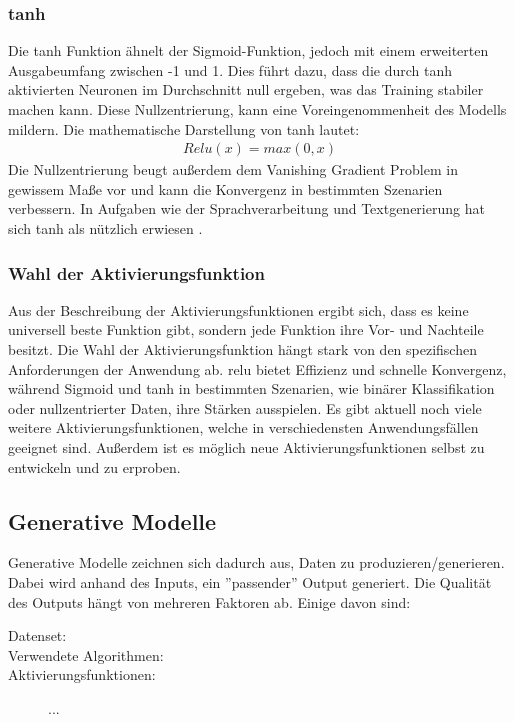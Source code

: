 \documentclass[12pt,a4paper]{article}
\begin{document}
		\subsubsection*{\ac{tanh}}
			Die \ac{tanh} Funktion ähnelt der Sigmoid-Funktion, jedoch mit einem erweiterten Ausgabeumfang zwischen -1 und 1. 
			Dies führt dazu, dass die durch \ac{tanh} aktivierten Neuronen im Durchschnitt null ergeben, was das Training stabiler machen kann. 
			Diese Nullzentrierung, kann eine Voreingenommenheit des Modells mildern. 
			Die mathematische Darstellung von \ac{tanh} lautet:
			\begin{align}
				Relu(x) = max(0,x)
			\end{align}
			Die Nullzentrierung beugt außerdem dem Vanishing Gradient Problem in gewissem Maße vor und kann die Konvergenz in bestimmten Szenarien verbessern.
			In Aufgaben wie der Sprachverarbeitung und Textgenerierung hat sich \ac{tanh} als nützlich erwiesen \cite[\ac{vgl}][]{site:machinelearningautomation}.

		\subsubsection*{Wahl der Aktivierungsfunktion}
			Aus der Beschreibung der Aktivierungsfunktionen ergibt sich, dass es keine universell beste Funktion gibt, sondern jede Funktion ihre Vor- und Nachteile besitzt.
			Die Wahl der Aktivierungsfunktion hängt stark von den spezifischen Anforderungen der Anwendung ab.
			\ac{relu} bietet Effizienz und schnelle Konvergenz, während Sigmoid und \ac{tanh} in bestimmten Szenarien, wie binärer Klassifikation oder nullzentrierter Daten, ihre Stärken ausspielen.
			Es gibt aktuell noch viele weitere Aktivierungsfunktionen, welche in verschiedensten Anwendungsfällen geeignet sind. 
			Außerdem ist es möglich neue Aktivierungsfunktionen selbst zu entwickeln und zu erproben.

	\subsection{Generative Modelle}
		Generative Modelle zeichnen sich dadurch aus, Daten zu produzieren/generieren.
		Dabei wird anhand des Inputs, ein ''passender'' Output generiert.
		Die Qualität des Outputs hängt von mehreren Faktoren ab.
		Einige davon sind: %
		\begin{description}
			\item[Datenset:]
			\item[Verwendete Algorithmen:]  
			\item[Aktivierungsfunktionen:] ...
		\end{description}
\end{document}
